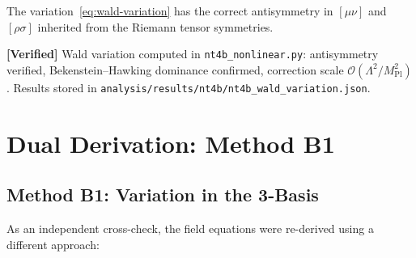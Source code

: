 \documentclass[11pt,a4paper]{article}
\theoremstyle{plain}
\theoremstyle{definition}
\newcommand{\verified}[1]{%
  \par\smallskip\noindent
  \colorbox{green!10}{\parbox{\dimexpr\linewidth-2\fboxsep}{%
    \textcolor{green!50!black}{\textbf{[Verified]}} #1}}%
  \par\smallskip}
\begin{document}
The variation~\eqref{eq:wald-variation} has the correct antisymmetry in
$[\mu\nu]$ and $[\rho\sigma]$ inherited from the Riemann tensor symmetries.

\verified{Wald variation computed in \texttt{nt4b\_nonlinear.py}:
antisymmetry verified, Bekenstein--Hawking dominance confirmed,
correction scale $\mathcal{O}(\Lambda^2/M_{\mathrm{Pl}}^2)$.
Results stored in \texttt{analysis/results/nt4b/nt4b\_wald\_variation.json}.}

\section{Dual Derivation: Method B1}\label{sec:method-b}

\subsection{Method B1: Variation in the 3-Basis}

As an independent cross-check, the field equations were re-derived using
a different approach:
\end{document}
